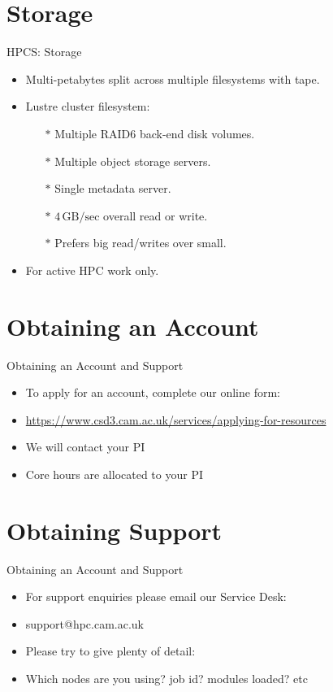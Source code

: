 \section{Storage}
\begin{frame}{HPCS: Storage}
\begin{itemize}
\item{Multi-petabytes split across multiple filesystems with tape.}
\item{Lustre cluster filesystem:}
\begin{itemize}
\item[$\ast$]{Multiple RAID6 back-end disk volumes.}
\item[$\ast$]{Multiple object storage servers.}
\item[$\ast$]{Single metadata server.}
\pause
\item[$\ast$]{\alert{$4\,\text{GB/sec}$ overall read or write.}}
\pause
\item[$\ast$]{\alert{Prefers big read/writes over small.}}
\end{itemize}
\pause
\item{\alert{For active HPC work only.}}
\end{itemize}
\end{frame}

\section{Obtaining an Account}
\begin{frame}{Obtaining an Account and Support}
\begin{itemize}
\item{To apply for an account, complete our online form:}
\item \small {\url{https://www.csd3.cam.ac.uk/services/applying-for-resources}}
\pause
\item{We will contact your PI}
\item{Core hours are allocated to your PI}
\end{itemize}
\end{frame}

\section{Obtaining Support}
\begin{frame}{Obtaining an Account and Support}
\begin{itemize}
\item{For support enquiries please email our Service Desk:}
\item{\alert{support@hpc.cam.ac.uk}}
\item{Please try to give plenty of detail:}
\item{Which nodes are you using? job id? modules loaded? etc}
\end{itemize}
\end{frame}